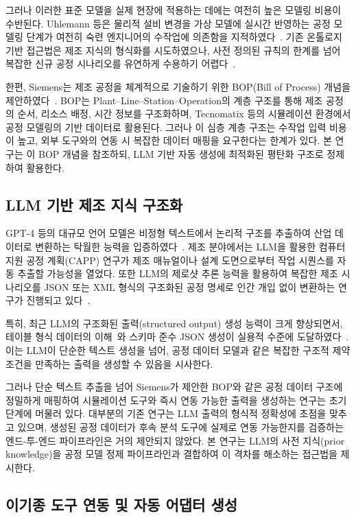 그러나 이러한 표준 모델을 실제 현장에 적용하는 데에는 여전히 높은 모델링 비용이 수반된다. Uhlemann 등은 물리적 설비 변경을 가상 모델에 실시간 반영하는 공정 모델링 단계가 여전히 숙련 엔지니어의 수작업에 의존함을 지적하였다~\cite{b4}. 기존 온톨로지 기반 접근법은 제조 지식의 형식화를 시도하였으나, 사전 정의된 규칙의 한계를 넘어 복잡한 신규 공정 시나리오를 유연하게 수용하기 어렵다~\cite{b5}.

한편, Siemens는 제조 공정을 체계적으로 기술하기 위한 BOP(Bill of Process) 개념을 제안하였다~\cite{b7}. BOP는 Plant--Line--Station--Operation의 계층 구조를 통해 제조 공정의 순서, 리소스 배정, 시간 정보를 구조화하며, Tecnomatix 등의 시뮬레이션 환경에서 공정 모델링의 기반 데이터로 활용된다. 그러나 이 심층 계층 구조는 수작업 입력 비용이 높고, 외부 도구와의 연동 시 복잡한 데이터 매핑을 요구한다는 한계가 있다. 본 연구는 이 BOP 개념을 참조하되, LLM 기반 자동 생성에 최적화된 평탄화 구조로 정제하여 활용한다.

\subsection{LLM 기반 제조 지식 구조화}

GPT-4 등의 대규모 언어 모델은 비정형 텍스트에서 논리적 구조를 추출하여 산업 데이터로 변환하는 탁월한 능력을 입증하였다~\cite{b6}. 제조 분야에서는 LLM을 활용한 컴퓨터 지원 공정 계획(CAPP) 연구가 제조 매뉴얼이나 설계 도면으로부터 작업 시퀀스를 자동 추출할 가능성을 열었다. 또한 LLM의 제로샷 추론 능력을 활용하여 복잡한 제조 시나리오를 JSON 또는 XML 형식의 구조화된 공정 명세로 인간 개입 없이 변환하는 연구가 진행되고 있다~\cite{b8}.

특히, 최근 LLM의 구조화된 출력(structured output) 생성 능력이 크게 향상되면서, 테이블 형식 데이터의 이해~\cite{b8}와 스키마 준수 JSON 생성이 실용적 수준에 도달하였다~\cite{b9}. 이는 LLM이 단순한 텍스트 생성을 넘어, 공정 데이터 모델과 같은 복잡한 구조적 제약 조건을 만족하는 출력을 생성할 수 있음을 시사한다.

그러나 단순 텍스트 추출을 넘어 Siemens가 제안한 BOP와 같은 공정 데이터 구조에 정밀하게 매핑하여 시뮬레이션 도구와 즉시 연동 가능한 출력을 생성하는 연구는 초기 단계에 머물러 있다. 대부분의 기존 연구는 LLM 출력의 형식적 정확성에 초점을 맞추고 있으며, 생성된 공정 데이터가 후속 분석 도구에 실제로 연동 가능한지를 검증하는 엔드-투-엔드 파이프라인은 거의 제안되지 않았다. 본 연구는 LLM의 사전 지식(prior knowledge)을 공정 모델 정제 파이프라인과 결합하여 이 격차를 해소하는 접근법을 제시한다.

\subsection{이기종 도구 연동 및 자동 어댑터 생성}

